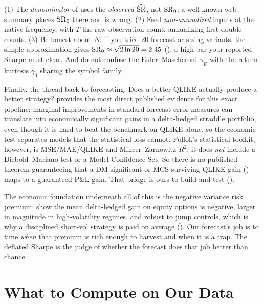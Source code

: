 \begin{warning}
(1) The \emph{denominator} of  uses the \emph{observed} $\widehat{\operatorname{SR}}$, not $\operatorname{SR}_0$; a well-known web summary places $\operatorname{SR}_0$ there and is wrong. (2) Feed \emph{non-annualized} inputs at the native frequency, with $T$ the raw observation count; annualizing first double-counts. (3) Be honest about $N$: if you tried $20$ forecast or sizing variants, the simple approximation gives $\operatorname{SR}_0 \approx \sqrt{2\ln 20} = 2.45$ (), a high bar your reported Sharpe must clear. And do not confuse the Euler--Mascheroni $\gamma_{\!E}$ with the return-kurtosis $\gamma_4$ sharing the symbol family.
\end{warning}

Finally, the thread back to forecasting. Does a better QLIKE actually produce a better strategy? \citet{Pollok2025} provides the most direct published evidence for this exact pipeline: marginal improvements in standard forecast-error measures can translate into economically significant gains in a delta-hedged straddle portfolio, even though it is hard to beat the benchmark on QLIKE alone, so the economic test separates models that the statistical loss cannot. Pollok's statistical toolkit, however, is MSE/MAE/QLIKE and Mincer--Zarnowitz $R^2$; it does \emph{not} include a Diebold--Mariano test or a Model Confidence Set. So there is no published theorem guaranteeing that a DM-significant or MCS-surviving QLIKE gain () maps to a guaranteed P\&L gain. That bridge is ours to build and test ().

\begin{application}
The economic foundation underneath all of this is the negative variance risk premium: \citet{BakshiKapadia2003} show the mean delta-hedged gain on equity options is negative, larger in magnitude in high-volatility regimes, and robust to jump controls, which is why a disciplined short-vol strategy is paid on average (). Our forecast's job is to time \emph{when} that premium is rich enough to harvest and when it is a trap. The deflated Sharpe is the judge of whether the forecast does that job better than chance.
\end{application}

\section{What to Compute on Our Data}
\label{sec:ivrv:experiments}

